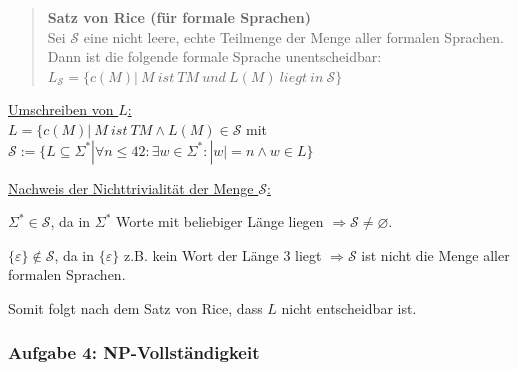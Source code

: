 \begin{teile}
	\vspace{0.3cm}

	\item
	\begin{quote}	
		\textbf{Satz von Rice (für formale Sprachen)}\\
		Sei $\mathcal{S} $ eine nicht leere, echte Teilmenge der Menge aller formalen Sprachen.\\
		Dann ist die folgende formale Sprache unentscheidbar:\\
		$L_\mathcal{S}  = \{c(M) |\ M\ ist\ TM\ und\ L(M)\ liegt\ in\ \mathcal{S}\}$
	\end{quote}
	
	\underline{Umschreiben von $L$:}\\
	$L=\{c(M)|\ M\ ist\ TM \wedge L(M) \in \mathcal{S}$ mit $\mathcal{S} := \{L\subseteq \Sigma^* | \forall n \leq 42: \exists w \in \Sigma^*: |w|=n \wedge w \in L\}$

	\underline{Nachweis der Nichttrivialität der Menge $\mathcal{S}$:}

	$\Sigma^* \in \mathcal{S}$, da in $\Sigma^*$ Worte mit beliebiger Länge liegen $\Rightarrow \mathcal{S} \neq \varnothing$.

	$\{\varepsilon\} \notin \mathcal{S}$, da in $\{\varepsilon\}$ z.B. kein Wort der Länge 3 liegt $\Rightarrow \mathcal{S}$ ist nicht die Menge aller formalen Sprachen.

	Somit folgt nach dem Satz von Rice, dass $L$ nicht entscheidbar ist.

\end{teile}

\newpage
\subsubsection{Aufgabe 4: NP-Vollständigkeit}

